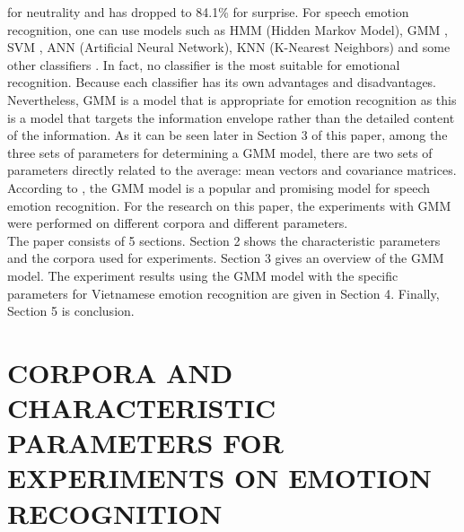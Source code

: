 \documentclass[a4paper,12pt]{article}
\begin{document}
for neutrality and has dropped to 84.1\% for surprise.
For speech emotion recognition, one can use models such as HMM (Hidden Markov
Model), GMM \cite{1,6,19}, SVM \cite{1,7}, ANN (Artificial Neural Network), KNN (K-Nearest
Neighbors) and some other classifiers \cite{1}. In fact, no classifier is the most suitable for
emotional recognition. Because each classifier has its own advantages and disadvantages.
Nevertheless, GMM is a model that is appropriate for emotion recognition as this is a model
that targets the information envelope rather than the detailed content of the information.
As it can be seen later in Section 3 of this paper, among the three sets of parameters for
determining a GMM model, there are two sets of parameters directly related to the average:
mean vectors and covariance matrices. According to \cite{7,18}, the GMM model is a popular
and promising model for speech emotion recognition. For the research on this paper, the
experiments with GMM were performed on different corpora and different parameters.
\\
The paper consists of 5 sections. Section 2 shows the characteristic parameters and the
corpora used for experiments. Section 3 gives an overview of the GMM model. The experiment results using the GMM model with the specific parameters for Vietnamese emotion
recognition are given in Section 4. Finally, Section 5 is conclusion.

\section{CORPORA AND CHARACTERISTIC PARAMETERS FOR EXPERIMENTS ON EMOTION RECOGNITION}
\end{document}
